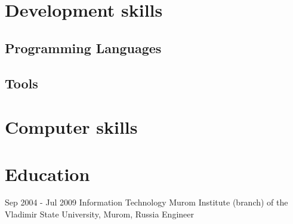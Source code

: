\documentclass[11pt,a4paper]{moderncv}
\begin{document}
\section{Development skills}
\subsection{Programming Languages}
\subsection{Tools}

\section{Computer skills}

\section{Education}
\cventry
  {Sep 2004 -  Jul 2009}
  {Information Technology}
  {Murom Institute (branch) of the Vladimir State University, Murom, Russia}
  {}{}
  {Engineer}
\end{document}

